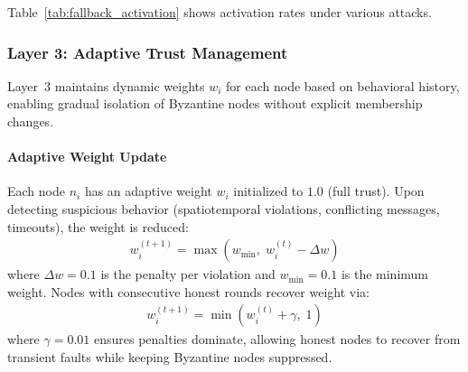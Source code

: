 \documentclass[manuscript,screen,review]{acmart}
\begin{document}
Table~\ref{tab:fallback_activation} shows activation rates under various attacks.

\begin{table}[h]
\centering
\caption{Fallback Tier Activation Rates (10,000 tasks, $N=50$)}
\label{tab:fallback_activation}
\small
{}
\end{table}

\subsubsection{Layer 3: Adaptive Trust Management}
\label{sec:layer3}

Layer~3 maintains dynamic weights $w_i$ for each node based on behavioral history, enabling gradual isolation of Byzantine nodes without explicit membership changes.

\paragraph{Adaptive Weight Update}

Each node $n_i$ has an adaptive weight $w_i$ initialized to $1.0$ (full trust). Upon detecting suspicious behavior (spatiotemporal violations, conflicting messages, timeouts), the weight is reduced:
\begin{equation}
\begin{aligned}
w_i^{(t+1)} = \max(w_{\min},\; w_i^{(t)} - \Delta w)
\label{eq:weight_penalty}
\end{aligned}
\end{equation}
where $\Delta w = 0.1$ is the penalty per violation and $w_{\min} = 0.1$ is the minimum weight. Nodes with consecutive honest rounds recover weight via:
\begin{equation}
\begin{aligned}
w_i^{(t+1)} = \min(w_i^{(t)} + \gamma,\; 1)
\label{eq:weight_recovery}
\end{aligned}
\end{equation}
where $\gamma = 0.01$ ensures penalties dominate, allowing honest nodes to recover from transient faults while keeping Byzantine nodes suppressed.
\end{document}
